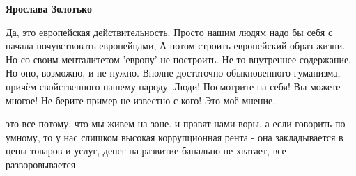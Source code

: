 \begin{itemize}
\begin{itemize}
\textbf{Ярослава Золотько} 

Да, это европейская действительность. Просто нашим людям надо бы себя с начала
почувствовать европейцами, А потом строить европейский образ жизни. Но со своим
менталитетом 'европу' не построить. Не то внутреннее содержание. Но оно,
возможно, и не нужно. Вполне достаточно обыкновенного гуманизма, причём
свойственного нашему народу. Люди! Посмотрите на себя! Вы можете многое! Не
берите пример не известно с кого! Это моё мнение.

\end{itemize} %


это все потому, что мы живем на зоне. и правят нами воры. а если говорить
по-умному, то у нас слишком высокая коррупционная рента - она закладывается в
цены товаров и услуг, денег на развитие банально не хватает, все
разворовывается

\end{itemize} %
